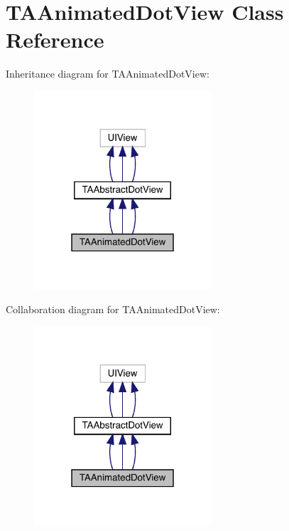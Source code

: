 \hypertarget{interface_t_a_animated_dot_view}{}\section{T\+A\+Animated\+Dot\+View Class Reference}
\label{interface_t_a_animated_dot_view}


Inheritance diagram for T\+A\+Animated\+Dot\+View\+:\nopagebreak
\begin{figure}[H]
\begin{center}
\leavevmode
\includegraphics[width=187pt]{interface_t_a_animated_dot_view__inherit__graph}
\end{center}
\end{figure}


Collaboration diagram for T\+A\+Animated\+Dot\+View\+:\nopagebreak
\begin{figure}[H]
\begin{center}
\leavevmode
\includegraphics[width=187pt]{interface_t_a_animated_dot_view__coll__graph}
\end{center}
\end{figure}
